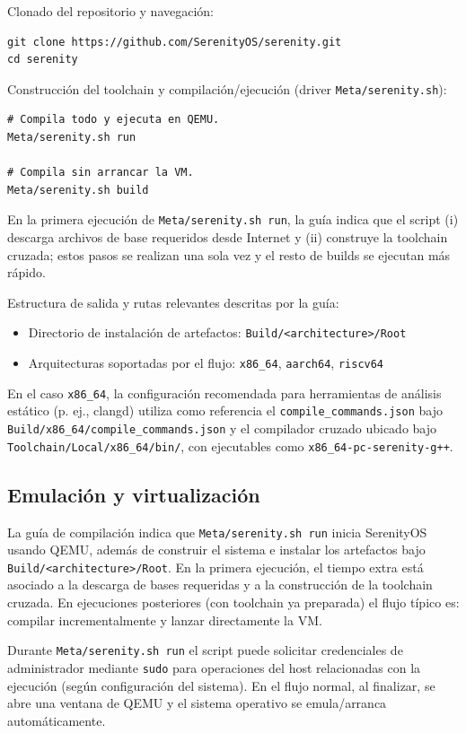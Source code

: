 Clonado del repositorio y navegación:
\begin{verbatim}
git clone https://github.com/SerenityOS/serenity.git
cd serenity
\end{verbatim}

Construcción del toolchain y compilación/ejecución (driver \texttt{Meta/serenity.sh}):
\begin{verbatim}
# Compila todo y ejecuta en QEMU.
Meta/serenity.sh run

# Compila sin arrancar la VM.
Meta/serenity.sh build
\end{verbatim}

En la primera ejecución de \texttt{Meta/serenity.sh run}, la guía indica que el script (i) descarga archivos de base requeridos desde Internet y (ii) construye la toolchain cruzada; estos pasos se realizan una sola vez y el resto de builds se ejecutan más rápido.

Estructura de salida y rutas relevantes descritas por la guía:
\begin{itemize}
		\item Directorio de instalación de artefactos: \texttt{Build/<architecture>/Root}
		\item Arquitecturas soportadas por el flujo: \texttt{x86\_64}, \texttt{aarch64}, \texttt{riscv64}
\end{itemize}

En el caso \texttt{x86\_64}, la configuración recomendada para herramientas de análisis estático (p.
ej., clangd) utiliza como referencia el \texttt{compile\_commands.json} bajo \texttt{Build/x86\_64/compile\_commands.json} y el compilador cruzado ubicado bajo \texttt{Toolchain/Local/x86\_64/bin/}, con ejecutables como \texttt{x86\_64-pc-serenity-g++}.

\subsection{Emulación y virtualización}
La guía de compilación indica que \texttt{Meta/serenity.sh run} inicia SerenityOS usando QEMU, además de construir el sistema e instalar los artefactos bajo \texttt{Build/<architecture>/Root}. En la primera ejecución, el tiempo extra está asociado a la descarga de bases requeridas y a la construcción de la toolchain cruzada. En ejecuciones posteriores (con toolchain ya preparada) el flujo típico es: compilar incrementalmente y lanzar directamente la VM.

Durante \texttt{Meta/serenity.sh run} el script puede solicitar credenciales de administrador mediante \texttt{sudo} para operaciones del host relacionadas con la ejecución (según configuración del sistema). En el flujo normal, al finalizar, se abre una ventana de QEMU y el sistema operativo se emula/arranca automáticamente.

